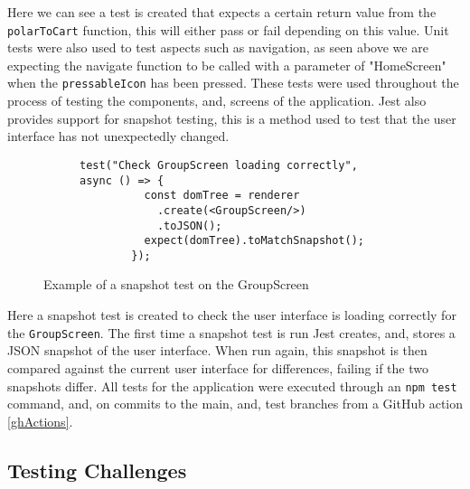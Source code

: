 Here we can see a test is created that expects a certain return value from the \texttt{polarToCart} function, this will either pass or fail depending on this value. Unit tests were also used to test aspects such as navigation, as seen above we are expecting the navigate function to be called with a parameter of "HomeScreen" when the \texttt{pressableIcon} has been pressed. These tests were used throughout the process of testing the components, and, screens of the application. Jest also provides support for snapshot testing, this is a method used to test that the user interface has not unexpectedly changed. 

\begin{figure}[!htbp]
    \centering
    \begin{subfigure}[b]{0.8\textwidth}
        \begin{lstlisting}[language=jsJsx]
        test("Check GroupScreen loading correctly", async () => {
          const domTree = renderer
            .create(<GroupScreen/>)
            .toJSON();
          expect(domTree).toMatchSnapshot();
        });
        \end{lstlisting}
    \end{subfigure}
\caption{Example of a snapshot test on the GroupScreen}
\label{fig:jestSnap}
\end{figure}
\FloatBarrier

Here a snapshot test is created to check the user interface is loading correctly for the \texttt{GroupScreen}. The first time a snapshot test is run Jest creates, and, stores a JSON snapshot of the user interface. When run again, this snapshot is then compared against the current user interface for differences, failing if the two snapshots differ. All tests for the application were executed through an \texttt{npm test} command, and, on commits to the main, and, test branches from a GitHub action \ref{ghActions}.

\subsection{Testing Challenges}\label{testChall}

